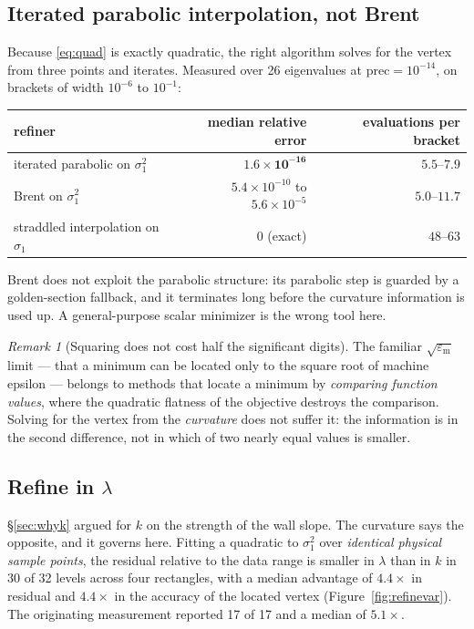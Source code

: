 \documentclass[11pt]{article}
\theoremstyle{definition}
\theoremstyle{remark}
\newtheorem{remark}{Remark}
\newcommand{\lam}{\lambda}
\newcommand{\sig}{\sigma}
\newcommand{\pr}{\mathrm{prec}}
\begin{document}
\subsection{Iterated parabolic interpolation, not Brent}

Because \eqref{eq:quad} is exactly quadratic, the right algorithm solves for the vertex from
three points and iterates. Measured over 26 eigenvalues at $\pr=10^{-14}$, on brackets of
width $10^{-6}$ to $10^{-1}$:
\begin{center}
\begin{tabular}{lrr}
\toprule
refiner & median relative error & evaluations per bracket\\
\midrule
iterated parabolic on $\sig_1^2$ & $\mathbf{1.6\times10^{-16}}$ & $\mathbf{5.5}$--$\mathbf{7.9}$\\
Brent on $\sig_1^2$ & $5.4\times10^{-10}$ to $5.6\times10^{-5}$ & $5.0$--$11.7$\\
straddled interpolation on $\sig_1$ & $0$ (exact) & $48$--$63$\\
\bottomrule
\end{tabular}
\end{center}
Brent does not exploit the parabolic structure: its parabolic step is guarded by a
golden-section fallback, and it terminates long before the curvature information is used up.
A general-purpose scalar minimizer is the wrong tool here.

\begin{remark}[Squaring does not cost half the significant digits]
\label{rem:squaring}
The familiar $\sqrt{\varepsilon_{\mathrm m}}$ limit --- that a minimum can be located only to
the square root of machine epsilon --- belongs to methods that locate a minimum by
\emph{comparing function values}, where the quadratic flatness of the objective destroys the
comparison. Solving for the vertex from the \emph{curvature} does not suffer it: the
information is in the second difference, not in which of two nearly equal values is smaller.
\end{remark}

\subsection{Refine in $\lam$}

\S\ref{sec:whyk} argued for $k$ on the strength of the wall slope. The curvature says the
opposite, and it governs here. Fitting a quadratic to $\sig_1^2$ over \emph{identical physical
sample points}, the residual relative to the data range is smaller in $\lam$ than in $k$ in 30
of 32 levels across four rectangles, with a median advantage of $4.4\times$ in residual and
$4.4\times$ in the accuracy of the located vertex (Figure~\ref{fig:refinevar}). The originating
measurement reported 17 of 17 and a median of $5.1\times$.
\end{document}
